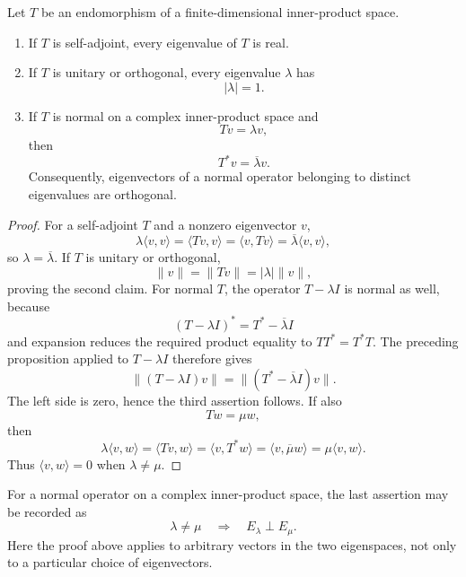\begin{proposition}\label{prop:eigenvalue-geometry}
Let \(T\) be an endomorphism of a finite-dimensional inner-product space.
\begin{enumerate}
\item If \(T\) is self-adjoint, every eigenvalue of \(T\) is real.
\item If \(T\) is unitary or orthogonal, every eigenvalue \(\lambda\) has
\[
|\lambda|=1.
\]
\item If \(T\) is normal on a complex inner-product space and
\[
Tv=\lambda v,
\]
then
\[
T^*v=\overline\lambda v.
\]
Consequently, eigenvectors of a normal operator belonging to distinct
eigenvalues are orthogonal.
\end{enumerate}
\end{proposition}
\begin{proof}
For a self-adjoint \(T\) and a nonzero eigenvector \(v\),
\[
\lambda\langle v,v\rangle
=\langle Tv,v\rangle
=\langle v,Tv\rangle
=\overline\lambda\langle v,v\rangle,
\]
so \(\lambda=\overline\lambda\). If \(T\) is unitary or orthogonal,
\[
\lVert v\rVert=\lVert Tv\rVert=|\lambda|\lVert v\rVert,
\]
proving the second claim.  For normal \(T\), the operator
\(T-\lambda I\) is normal as well, because
\[
(T-\lambda I)^*=T^*-\overline\lambda I
\]
and expansion reduces the required product equality to \(TT^*=T^*T\).
The preceding proposition applied to \(T-\lambda I\) therefore gives
\[
\lVert(T-\lambda I)v\rVert
=\lVert(T^*-\overline\lambda I)v\rVert.
\]
The left side is zero, hence the third assertion follows. If also
\[
Tw=\mu w,
\]
then
\[
\lambda\langle v,w\rangle
=\langle Tv,w\rangle
=\langle v,T^*w\rangle
=\langle v,\overline\mu w\rangle
=\mu\langle v,w\rangle.
\]
Thus \(\langle v,w\rangle=0\) when \(\lambda\ne\mu\).
\end{proof}

For a normal operator on a complex inner-product space, the last assertion
may be recorded as
\[
\lambda\ne\mu
\quad\Longrightarrow\quad
E_\lambda\perp E_\mu.
\]
Here the proof above applies to arbitrary vectors in the two eigenspaces,
not only to a particular choice of eigenvectors.

